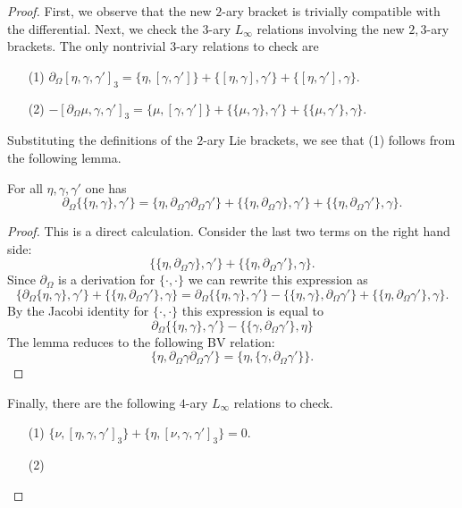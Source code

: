 \documentclass[11pt]{amsart}
\def\div{\partial_\Omega}
\begin{document}
\begin{proof}
First, we observe that the new $2$-ary bracket is trivially compatible with the differential. 
Next, we check the $3$-ary $L_\infty$ relations involving the new $2,3$-ary brackets. 
The only nontrivial $3$-ary relations to check are
\begin{itemize}
\item[(1)] $\div [\eta, \gamma, \gamma']_3 = \{\eta, [\gamma, \gamma']\} + \{[\eta, \gamma], \gamma'\} + \{[\eta, \gamma'], \gamma\}.$
\item[(2)] $- [\div \mu, \gamma, \gamma']_3  = \{\mu, [\gamma, \gamma']\} + \{\{\mu, \gamma\}, \gamma'\} + \{\{\mu, \gamma'\}, \gamma\}$. 

\end{itemize}

Substituting the definitions of the $2$-ary Lie brackets, we see that (1) follows from the following lemma. 
\begin{lem}
For all $\eta, \gamma, \gamma'$ one has
\begin{equation}\label{eqn:C43ary}
\div \{\{\eta, \gamma\}, \gamma'\} = \{\eta, \div \gamma \div \gamma'\} + \{\{\eta, \div \gamma\}, \gamma'\} + \{\{\eta, \div \gamma'\}, \gamma\} .
\end{equation}
\end{lem}
\begin{proof}
This is a direct calculation. 
Consider the last two terms on the right hand side:
\[
\{\{\eta, \div \gamma\}, \gamma'\} + \{\{\eta, \div \gamma'\}, \gamma\} .
\]
Since $\div$ is a derivation for $\{\cdot,\cdot\}$ we can rewrite this expression as
\[
\{\div\{\eta, \gamma\}, \gamma'\} + \{\{\eta, \div \gamma'\}, \gamma\} = \div \{\{\eta, \gamma\}, \gamma'\} - \{\{\eta, \gamma\}, \div \gamma'\} + \{\{\eta, \div \gamma'\}, \gamma\} .
\]
By the Jacobi identity for $\{\cdot, \cdot\}$ this expression is equal to
\[
\div\{\{\eta, \gamma\}, \gamma'\} - \{\{\gamma, \div \gamma'\}, \eta\} 
\]
The lemma reduces to the following BV relation:
\[
\{\eta, \div \gamma \div \gamma'\} = \{\eta, \{\gamma, \div \gamma'\}\} .
\]

\end{proof}

Finally, there are the following $4$-ary $L_\infty$ relations to check. 
\begin{itemize}
\item[(1)] $\{\nu, [\eta, \gamma, \gamma']_3\} + \{\eta, [\nu, \gamma, \gamma']_3\} = 0.$ 
\item[(2)]
\end{itemize}

\end{proof}
\end{document}
